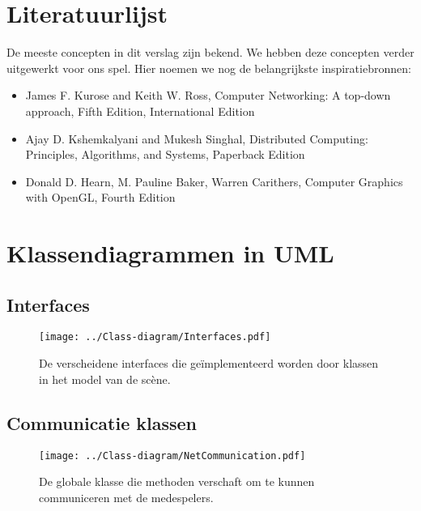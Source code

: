 \documentclass[a4paper,11pt, twoside]{article}
\begin{document}
    \section{Literatuurlijst}
    De meeste concepten in dit verslag zijn bekend. We hebben deze concepten verder uitgewerkt voor ons spel. Hier noemen we nog de belangrijkste inspiratiebronnen:
    \begin{itemize}
    \item James F. Kurose and Keith W. Ross, Computer Networking: A top-down approach, Fifth Edition, International Edition
    \item Ajay D. Kshemkalyani and Mukesh Singhal, Distributed Computing: Principles, Algorithms, and Systems, Paperback Edition
    \item Donald D. Hearn, M. Pauline Baker, Warren Carithers, Computer Graphics with OpenGL, Fourth Edition
    \end{itemize}
    \newpage

    \appendix

    
    \newpage

    
    \newpage

    
    \newpage

    
    \newpage

    
    \newpage

    \section{Klassendiagrammen in UML}
    \label{app:klassendiagram}

    \subsection{Interfaces}
    \begin{figure}[h]
    \centering
    	\texttt{[image: ../Class-diagram/Interfaces.pdf]}
    	\caption{De verscheidene interfaces die ge\"implementeerd worden door klassen in het model van de sc\`ene.}
    \end{figure}\FloatBarrier    \label{app:Interfaces}
    \begin{samepage}

    \subsection{Communicatie klassen} \begin{figure}[h]
        \centering  	\texttt{[image: ../Class-diagram/NetCommunication.pdf]}
	\caption{De globale klasse die methoden verschaft om te kunnen communiceren met de medespelers.}
    \end{figure}
    \label{app:Comm}
    \end{samepage}
    \FloatBarrier
    \newpage
\end{document}

